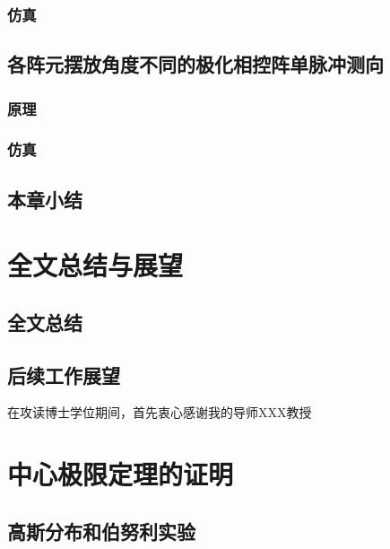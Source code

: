 \documentclass[master]{thesis-uestc}
\begin{document}
\subsection{仿真}

\section{各阵元摆放角度不同的极化相控阵单脉冲测向}

\subsection{原理}

\subsection{仿真}

\section{本章小结}

\chapter{全文总结与展望}

\section{全文总结}

\section{后续工作展望}

\thesisacknowledgement
在攻读博士学位期间，首先衷心感谢我的导师XXX教授

\thesisappendix

\chapter{中心极限定理的证明}

\section{高斯分布和伯努利实验}



\end{document}
